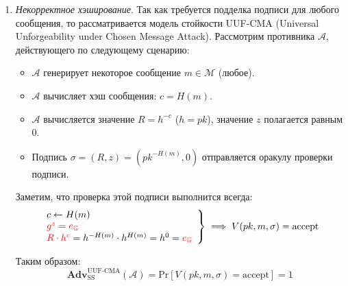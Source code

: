 \documentclass[12pt, a4paper]{extarticle}
\begin{document}
\begin{enumerate}
    \item \textit{Некорректное хэширование}. Так как требуется подделка подписи для любого сообщения, 
    	то рассматривается модель стойкости UUF-CMA (Universal Unforgeability under Chosen Message 
    	Attack). Рассмотрим противника $\mathcal{A}$, действующего по следующему сценарию:
        \begin{itemize}
            \item $\mathcal{A}$ генерирует некоторое сообщение $m \in \mathcal{M}$ (любое).
            
            \item $\mathcal{A}$ вычисляет хэш сообщения: $c = H(m)$.
            
            \item $\mathcal{A}$ вычисляется значение $R = h^{-c}$ ($h = pk$), значение $z$ полагается 
            	равным 0.
            
            \item Подпись $\sigma = (R, z) = (pk^{-H(m)}, 0)$ отправляется оракулу проверки подписи.
        \end{itemize}
        
        Заметим, что проверка этой подписи выполнится всегда:
        \begin{equation*}
            \left.\begin{array}{l}
                c \leftarrow H(m) \\
                \textcolor{red}{g^z} = \textcolor{red}{e_{\mathbb{G}}} \\
                \textcolor{red}{R \cdot h^c} = h^{-H(m)} \cdot h^{H(m)} = h^0 = 
                    \textcolor{red}{e_{\mathbb{G}}}
            \end{array}\right\} \implies V(pk, m, \sigma) = \text{accept}
        \end{equation*}
        
        Таким образом:
        \begin{equation*}
            \textbf{Adv}_{\text{SS}}^{\text{UUF-CMA}}(\mathcal{A}) = 
                \text{Pr}[V(pk, m, \sigma) = \text{accept}] = 1
        \end{equation*}
        

\end{enumerate}
\end{document}
